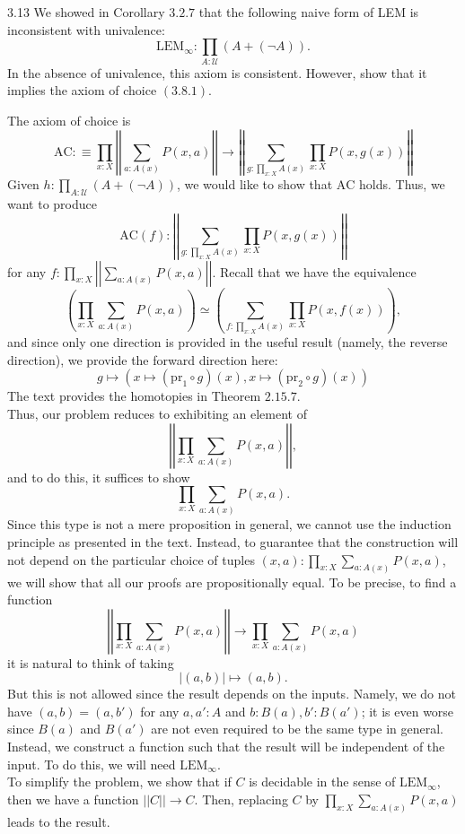 \documentclass[14pt]{extarticle}
\newcommand{\0}{{\mathbf 0}}
\newcommand{\1}{{\mathbf 1}}
\newcommand{\2}{{\mathbf 2}}
\newcommand{\UU}{{\mathcal U}}
\newcommand{\mt}{\mapsto}
\newcommand{\pr}{\mathrm{pr}}
\newcommand{\AC}{\mathrm{AC}}
\newcommand{\LEM}{\mathrm{LEM}}
\begin{document}
\begin{prob}{3.13}{}
We showed in Corollary $3.2.7$ that the following naive form of LEM is inconsistent with univalence: \[\LEM_{\infty} : \prod_{A:\UU}(A + (\neg A)).\] In the absence of univalence, this axiom is consistent. However, show that it implies the axiom of choice $(3.8.1)$.
\end{prob}
The axiom of choice is 
\[\AC :\equiv \prod_{x : X} \left| \left|\sum_{a:A(x)} P(x,a) \right|\right| \to \left| \left| \sum_{g:\prod_{x:X}A(x)} \prod_{x:X} P(x,g(x)) \right|\right|\]
Given $h : \prod_{A:\UU}(A + (\neg A))$, we would like to show that $\AC$ holds. Thus, we want to produce
\[\AC(f) : \left| \left| \sum_{g:\prod_{x:X}A(x)} \prod_{x:X} P(x,g(x)) \right|\right|\] for any $f : \prod_{x : X} \left| \left|\sum_{a:A(x)} P(x,a) \right|\right|$. Recall that we have the equivalence
\[\left(\prod_{x : X} \sum_{a:A(x)} P(x,a) \right) \simeq \left(\sum_{f : \prod_{x:X}A(x)} \prod_{x:X}P(x,f(x)) \right),\] and since only one direction is provided in the useful result (namely, the reverse direction), we provide the forward direction here:
\[g \mt (x \mt (\pr_1 \circ g)(x), x \mt (\pr_2 \circ g)(x))\] The text provides the homotopies in Theorem $2.15.7$.\\ 
Thus, our problem reduces to exhibiting an element of
\[\left| \left|\prod_{x:X}\sum_{a:A(x)}P(x,a)\right| \right|,\] and to do this, it suffices to show
\[\prod_{x:X}\sum_{a:A(x)}P(x,a).\] Since this type is not a mere proposition in general, we cannot use the induction principle as presented in the text. Instead, to guarantee that the construction will not depend on the particular choice of tuples $(x,a) : \prod_{x:X}\sum_{a:A(x)}P(x,a)$, we will show that all our proofs are propositionally equal. To be precise, to find a function
\[\left| \left|\prod_{x:X}\sum_{a:A(x)}P(x,a)\right| \right| \to \prod_{x:X}\sum_{a:A(x)}P(x,a)\] it is natural to think of taking
\[|(a,b)| \mt (a,b).\] But this is not allowed since the result depends on the inputs. Namely, we do not have $(a,b) = (a,b')$ for any $a,a':A$ and $b:B(a), b':B(a')$; it is even worse since $B(a)$ and $B(a')$ are not even required to be the same type in general. Instead, we construct a function such that the result will be independent of the input. To do this, we will need $\LEM_{\infty}$. \\
To simplify the problem, we show that if $C$ is decidable in the sense of $\LEM_{\infty}$, then we have a function $||C|| \to C$. Then, replacing $C$ by $\prod_{x:X}\sum_{a:A(x)}P(x,a)$ leads to the result.\\
\end{document}
